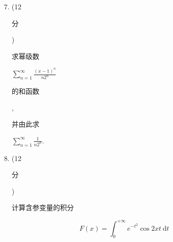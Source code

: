 \documentclass[10pt]{article}
\begin{document}
\begin{enumerate}
  \setcounter{enumi}{6}
  \item (12 \begin{CJK}{UTF8}{mj}分\end{CJK}) \begin{CJK}{UTF8}{mj}求幂级数\end{CJK} $\sum_{n=1}^{\infty} \frac{(x-1)^{n}}{n 2^{n}}$ \begin{CJK}{UTF8}{mj}的和函数\end{CJK}, \begin{CJK}{UTF8}{mj}并由此求\end{CJK} $\sum_{n=1}^{\infty} \frac{1}{n 2^{n}}$.

  \item (12 \begin{CJK}{UTF8}{mj}分\end{CJK}) \begin{CJK}{UTF8}{mj}计算含参变量的积分\end{CJK}

\end{enumerate}
$$
F(x)=\int_{0}^{+\infty} e^{-t^{2}} \cos 2 x t \mathrm{~d} t
$$
\end{document}
